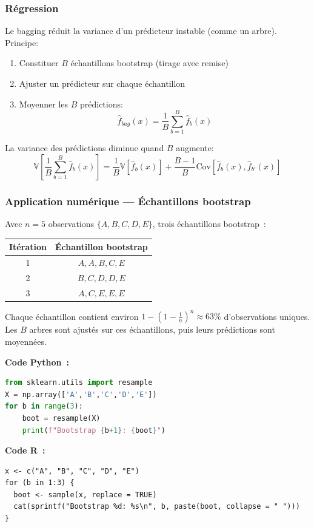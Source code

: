\documentclass[a4paper,12pt]{article}
\begin{document}
\subsubsection{Régression}
Le bagging réduit la variance d'un prédicteur instable (comme un arbre). Principe:
\begin{enumerate}
  \item Constituer $B$ échantillons bootstrap (tirage avec remise)
  \item Ajuster un prédicteur sur chaque échantillon
  \item Moyenner les $B$ prédictions: \[\hat{f}_{bag}(x) = \dfrac{1}{B} \sum_{b=1}^{B} \hat{f}_b(x)\]
\end{enumerate}

La variance des prédictions diminue quand $B$ augmente:
\[
\mathbb{V}\left[\frac{1}{B}\sum_{b=1}^{B} \hat{f}_b(x)\right] = \frac{1}{B} \mathbb{V}[\hat{f}_b(x)] + \frac{B-1}{B} \text{Cov}[\hat{f}_b(x), \hat{f}_{b'}(x)]
\]

\subsubsection*{Application numérique — Échantillons bootstrap}
Avec $n=5$ observations $\{A,B,C,D,E\}$, trois échantillons bootstrap~:

\begin{center}
\begin{tabular}{c|c}
Itération & Échantillon bootstrap \\
\midrule
1 & $A, A, B, C, E$ \\
2 & $B, C, D, D, E$ \\
3 & $A, C, E, E, E$ \\
\end{tabular}
\end{center}

Chaque échantillon contient environ $1-(1-\frac1n)^n \approx 63\%$ d'observations uniques.
Les $B$ arbres sont ajustés sur ces échantillons, puis leurs prédictions sont moyennées.

\newpage
\noindent\textbf{Code Python~:}
\begin{lstlisting}[language=Python]
from sklearn.utils import resample
X = np.array(['A','B','C','D','E'])
for b in range(3):
    boot = resample(X)
    print(f"Bootstrap {b+1}: {boot}")
\end{lstlisting}

\noindent\textbf{Code R~:}
\begin{lstlisting}[]
x <- c("A", "B", "C", "D", "E")
for (b in 1:3) {
  boot <- sample(x, replace = TRUE)
  cat(sprintf("Bootstrap %d: %s\n", b, paste(boot, collapse = " ")))
}
\end{lstlisting}
\newpage
\end{document}
